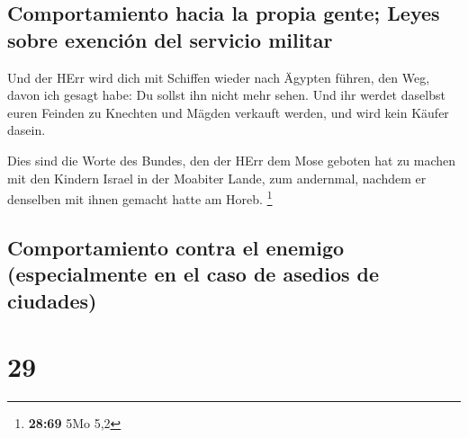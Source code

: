 \hypertarget{comportamiento-hacia-la-propia-gente-leyes-sobre-exenciuxf3n-del-servicio-militar}{%
\subsection{Comportamiento hacia la propia gente; Leyes sobre exención
del servicio
militar}\label{comportamiento-hacia-la-propia-gente-leyes-sobre-exenciuxf3n-del-servicio-militar}}

 Und der HErr wird dich mit Schiffen wieder nach Ägypten
führen, den Weg, davon ich gesagt habe: Du sollst ihn nicht mehr sehen.
Und ihr werdet daselbst euren Feinden zu Knechten und Mägden verkauft
werden, und wird kein Käufer dasein.

 Dies sind die Worte des Bundes, den der HErr dem Mose
geboten hat zu machen mit den Kindern Israel in der Moabiter Lande, zum
andernmal, nachdem er denselben mit ihnen gemacht hatte am Horeb.
\footnote{\textbf{28:69} 5Mo 5,2}

\hypertarget{comportamiento-contra-el-enemigo-especialmente-en-el-caso-de-asedios-de-ciudades}{%
\subsection{Comportamiento contra el enemigo (especialmente en el caso
de asedios de
ciudades)}\label{comportamiento-contra-el-enemigo-especialmente-en-el-caso-de-asedios-de-ciudades}}

\hypertarget{section-28}{%
\section{29}\label{section-28}}

